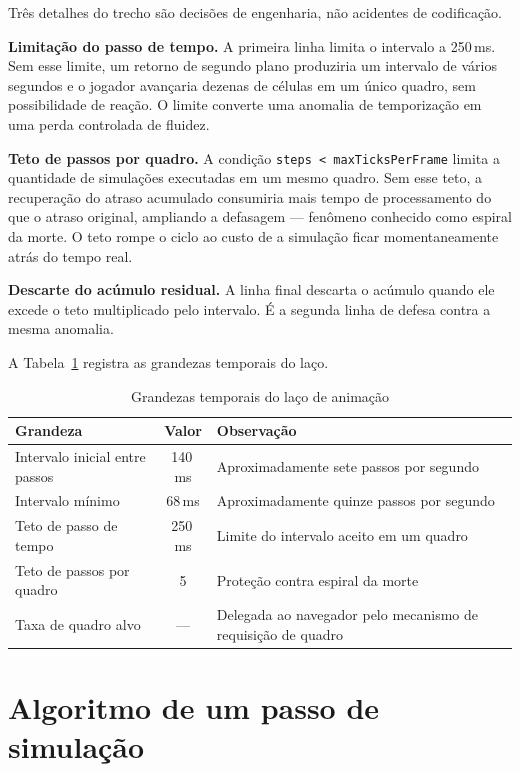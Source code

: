 Três detalhes do trecho são decisões de engenharia, não acidentes de codificação.

\textbf{Limitação do passo de tempo.} A primeira linha limita o intervalo a
250\,ms. Sem esse limite, um retorno de segundo plano produziria um intervalo de
vários segundos e o jogador avançaria dezenas de células em um único quadro, sem
possibilidade de reação. O limite converte uma anomalia de temporização em uma
perda controlada de fluidez.

\textbf{Teto de passos por quadro.} A condição \texttt{steps < maxTicksPerFrame}
limita a quantidade de simulações executadas em um mesmo quadro. Sem esse teto, a
recuperação do atraso acumulado consumiria mais tempo de processamento do que o
atraso original, ampliando a defasagem --- fenômeno conhecido como espiral da
morte. O teto rompe o ciclo ao custo de a simulação ficar momentaneamente atrás
do tempo real.

\textbf{Descarte do acúmulo residual.} A linha final descarta o acúmulo quando
ele excede o teto multiplicado pelo intervalo. É a segunda linha de defesa contra
a mesma anomalia.

A Tabela~\ref{tab:tempos} registra as grandezas temporais do laço.

\begin{table}[htb]
	\caption{Grandezas temporais do laço de animação}
	\label{tab:tempos}
	\centering
	\footnotesize
	\begin{tabularx}{\textwidth}{@{}p{4.4cm} c X@{}}
		\toprule
		\textbf{Grandeza} & \textbf{Valor} & \textbf{Observação} \\
		\midrule
		Intervalo inicial entre passos & 140\,ms & Aproximadamente sete passos por segundo \\
		\addlinespace
		Intervalo mínimo & 68\,ms & Aproximadamente quinze passos por segundo \\
		\addlinespace
		Teto de passo de tempo & 250\,ms & Limite do intervalo aceito em um quadro \\
		\addlinespace
		Teto de passos por quadro & 5 & Proteção contra espiral da morte \\
		\addlinespace
		Taxa de quadro alvo & --- & Delegada ao navegador pelo mecanismo de requisição de quadro \\
		\bottomrule
	\end{tabularx}
\end{table}

\section{Algoritmo de um passo de simulação}
\label{sec:impl-tick}

